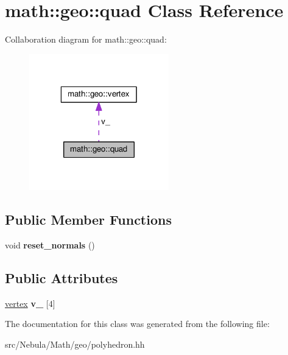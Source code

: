 \hypertarget{classmath_1_1geo_1_1quad}{\section{math\-:\-:geo\-:\-:quad Class Reference}
\label{classmath_1_1geo_1_1quad}
}


Collaboration diagram for math\-:\-:geo\-:\-:quad\-:
\nopagebreak
\begin{figure}[H]
\begin{center}
\leavevmode
\includegraphics[width=172pt]{classmath_1_1geo_1_1quad__coll__graph}
\end{center}
\end{figure}
\subsection*{Public Member Functions}
\begin{DoxyCompactItemize}
\item 
\hypertarget{classmath_1_1geo_1_1quad_a61f7422d3d82b7acab0aabd71b68fccf}{void {\bfseries reset\-\_\-normals} ()}\label{classmath_1_1geo_1_1quad_a61f7422d3d82b7acab0aabd71b68fccf}

\end{DoxyCompactItemize}
\subsection*{Public Attributes}
\begin{DoxyCompactItemize}
\item 
\hypertarget{classmath_1_1geo_1_1quad_a6625bbd8467b8a853aae1f4f2a2362ec}{\hyperlink{classmath_1_1geo_1_1vertex}{vertex} {\bfseries v\-\_\-} \mbox{[}4\mbox{]}}\label{classmath_1_1geo_1_1quad_a6625bbd8467b8a853aae1f4f2a2362ec}

\end{DoxyCompactItemize}


The documentation for this class was generated from the following file\-:\begin{DoxyCompactItemize}
\item 
src/\-Nebula/\-Math/geo/polyhedron.\-hh\end{DoxyCompactItemize}
